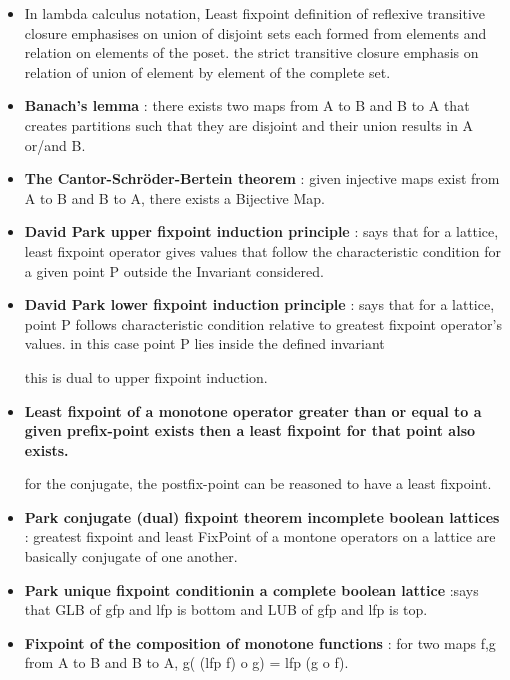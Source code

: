 \begin{itemize}
{\begin{itemize}
		\item{In lambda calculus notation, Least fixpoint definition of reflexive transitive closure emphasises on union of disjoint sets each formed from elements and  relation on elements of the poset. the strict transitive closure emphasis on relation of union of element by element of the complete set.
		}

		\item{\textbf{Banach’s lemma} : there exists two maps from A to B and B to A that creates partitions such that they are disjoint and their union results in A or/and B. 
		}

		\item{\textbf{The Cantor-Schröder-Bertein theorem} : given injective maps exist from A to B and B to A, there exists a Bijective Map.
		}

		\item{\textbf{David Park upper fixpoint induction principle} : says that for a lattice, least fixpoint operator gives values that follow the characteristic condition for a given point P outside the Invariant considered. 
		}
		
		\item{\textbf{David Park lower fixpoint induction principle} : says that for a lattice, point P follows characteristic condition relative to greatest fixpoint operator's values. in this case point P lies inside the defined invariant

		this is dual to upper fixpoint induction. 
		}

		\item{\textbf{Least fixpoint of a monotone operator greater than or equal to a given prefix-point exists then a least fixpoint for that point also exists. } 

		for the conjugate, the postfix-point can be reasoned to have a least fixpoint.
		}

		\item{\textbf{Park conjugate (dual) fixpoint theorem incomplete boolean lattices} :
		greatest fixpoint and least FixPoint of a montone operators on a lattice are basically conjugate of one another.
		}

		\item{\textbf{Park unique fixpoint conditionin a complete boolean lattice} :says that GLB of gfp and lfp is bottom and LUB of gfp and lfp is top. 
		}

		\item{\textbf{Fixpoint of the composition of monotone functions} : for two maps f,g from A to B and B to A, g( (lfp f) o g) = lfp (g o f).

}
\end{itemize}}
\end{itemize}
